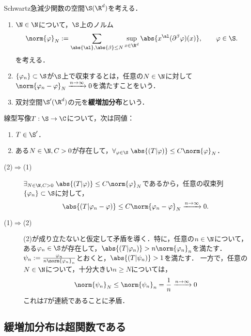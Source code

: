 \documentclass[uplatex,dvipdfmx]{jsreport}
\begin{document}
\begin{definition}
    Schwartz急減少関数の空間$\S(\R^d)$を考える．
    \begin{enumerate}
        \item $\N\in\N$について，$\S$上のノルム
        \[\norm{\varphi}_N:=\sum_{\abs{\al},\abs{\beta}\le N}\sup_{x\in\R^d}\abs{x^\al(\partial^\beta\varphi)(x)},\qquad\varphi\in\S.\]
        を考える．
        \item $\{\varphi_n\}\subset\S$が$\S$上で収束するとは，任意の$N\in\N$に対して$\norm{\varphi_n-\varphi}_N\xrightarrow{n\to\infty}0$を満たすことをいう．
        \item 双対空間$\S'(\R^d)$の元を\textbf{緩増加分布}という．
    \end{enumerate}
\end{definition}

\begin{proposition}\label{prop-characterization-of-tempered-distribution}
    線型写像$T:\S\to\C$について，次は同値：
    \begin{enumerate}
        \item $T\in\S'$．
        \item ある$N\in\N,C>0$が存在して，$\forall_{\varphi\in\S}\;\abs{(T|\varphi)}\le C\norm{\varphi}_N$．
    \end{enumerate}
\end{proposition}
\begin{Proof}\mbox{}
    \begin{description}
        \item[(2)$\Rightarrow$(1)] $\exists_{N\in\N,C>0}\;\abs{(T|\varphi)}\le C\norm{\varphi}_N$であるから，任意の収束列$\{\varphi_n\}\subset\S$に対して，
        \[\abs{(T|\varphi_n-\varphi)}\le C\norm{\varphi_n-\varphi}_N\xrightarrow{n\to\infty}0.\]
        \item[(1)$\Rightarrow$(2)] (2)が成り立たないと仮定して矛盾を導く．特に，任意の$n\in\N$について，ある$\varphi_n\in\S$が存在して，$\abs{(T|\varphi_n)}>n\norm{\varphi_n}_n$を満たす．
        $\psi_n:=\frac{\varphi_n}{n\norm{\varphi_n}_n}$とおくと，$\abs{(T|\psi_n)}>1$を満たす．
        一方で，任意の$N\in\N$について，十分大きい$n\ge N$については，
        \[\norm{\psi_n}_N\le\norm{\psi_n}_n=\frac{1}{n}\xrightarrow{n\to\infty}0\]
        これは$T$が連続であることに矛盾．
    \end{description}
\end{Proof}

\subsection{緩増加分布は超関数である}
\end{document}
